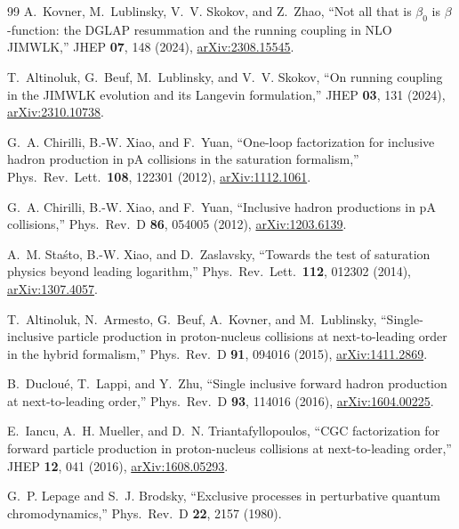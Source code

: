 \begin{thebibliography}{99}
A.~Kovner, M.~Lublinsky, V.~V. Skokov, and Z.~Zhao, ``Not all that is $\beta_0$ is $\beta$-function: the DGLAP resummation and the running coupling in NLO JIMWLK,'' JHEP \textbf{07}, 148 (2024), \href{https://arxiv.org/abs/2308.15545}{arXiv:2308.15545}.

T.~Altinoluk, G.~Beuf, M.~Lublinsky, and V.~V. Skokov, ``On running coupling in the JIMWLK evolution and its Langevin formulation,'' JHEP \textbf{03}, 131 (2024), \href{https://arxiv.org/abs/2310.10738}{arXiv:2310.10738}.

G.~A. Chirilli, B.-W. Xiao, and F.~Yuan, ``One-loop factorization for inclusive hadron production in pA collisions in the saturation formalism,'' Phys.\ Rev.\ Lett.\ \textbf{108}, 122301 (2012), \href{https://arxiv.org/abs/1112.1061}{arXiv:1112.1061}.

G.~A. Chirilli, B.-W. Xiao, and F.~Yuan, ``Inclusive hadron productions in pA collisions,'' Phys.\ Rev.\ D \textbf{86}, 054005 (2012), \href{https://arxiv.org/abs/1203.6139}{arXiv:1203.6139}.

A.~M. Sta\'sto, B.-W. Xiao, and D.~Zaslavsky, ``Towards the test of saturation physics beyond leading logarithm,'' Phys.\ Rev.\ Lett.\ \textbf{112}, 012302 (2014), \href{https://arxiv.org/abs/1307.4057}{arXiv:1307.4057}.

T.~Altinoluk, N.~Armesto, G.~Beuf, A.~Kovner, and M.~Lublinsky, ``Single-inclusive particle production in proton-nucleus collisions at next-to-leading order in the hybrid formalism,'' Phys.\ Rev.\ D \textbf{91}, 094016 (2015), \href{https://arxiv.org/abs/1411.2869}{arXiv:1411.2869}.

B.~Duclou\'e, T.~Lappi, and Y.~Zhu, ``Single inclusive forward hadron production at next-to-leading order,'' Phys.\ Rev.\ D \textbf{93}, 114016 (2016), \href{https://arxiv.org/abs/1604.00225}{arXiv:1604.00225}.

E.~Iancu, A.~H. Mueller, and D.~N. Triantafyllopoulos, ``CGC factorization for forward particle production in proton-nucleus collisions at next-to-leading order,'' JHEP \textbf{12}, 041 (2016), \href{https://arxiv.org/abs/1608.05293}{arXiv:1608.05293}.

G.~P. Lepage and S.~J. Brodsky, ``Exclusive processes in perturbative quantum chromodynamics,'' Phys.\ Rev.\ D \textbf{22}, 2157 (1980).


\end{thebibliography}
